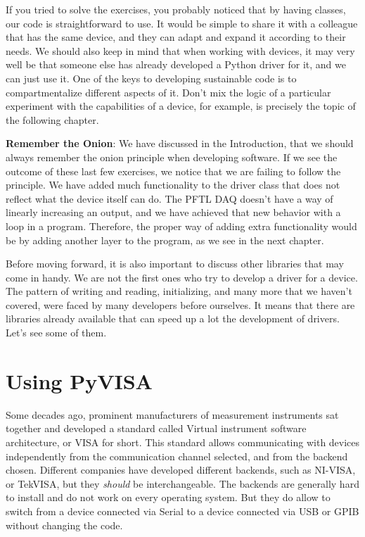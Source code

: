 

If you tried to solve the exercises, you probably noticed that by having classes, our code is straightforward to use. It would be simple to share it with a colleague that has the same device, and they can adapt and expand it according to their needs. We should also keep in mind that when working with devices, it may very well be that someone else has already developed a Python driver for it, and we can just use it. One of the keys to developing sustainable code is to compartmentalize different aspects of it. Don't mix the logic of a particular experiment with the capabilities of a device, for example, is precisely the topic of the following chapter.

\textbf{Remember the Onion}: We have discussed in the Introduction, that we should always remember the onion principle when developing software. If we see the outcome of these last few exercises, we notice that we are failing to follow the principle. We have added much functionality to the driver class that does not reflect what the device itself can do. The {PFTL DAQ} doesn't have a way of linearly increasing an output, and we have achieved that new behavior with a loop in a program. Therefore, the proper way of adding extra functionality would be by adding another layer to the program, as we see in the next chapter.

Before moving forward, it is also important to discuss other libraries that may come in handy. We are not the first ones who try to develop a driver for a device. The pattern of writing and reading, initializing, and many more that we haven't covered, were faced by many developers before ourselves. It means that there are libraries already available that can speed up a lot the development of drivers. Let's see some of them.

\section{Using PyVISA}\label{sec:pyvisa}
Some decades ago, prominent manufacturers of measurement instruments sat together and developed a standard called Virtual instrument software architecture, or VISA for short. This standard allows communicating with devices independently from the communication channel selected, and from the backend chosen. Different companies have developed different backends, such as NI-VISA, or TekVISA, but they \emph{should} be interchangeable. The backends are generally hard to install and do not work on every operating system. But they do allow to switch from a device connected via Serial to a device connected via USB or GPIB without changing the code.

